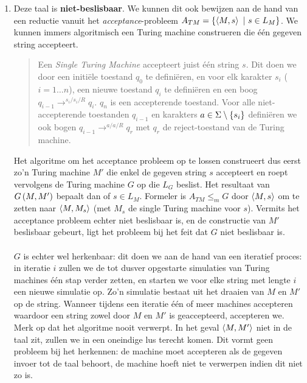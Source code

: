\documentclass{article}
\begin{document}
\begin{question}[Beslisbaarheid]
\begin{answer}
\begin{enumerate}
 \item Deze taal is \textbf{niet-beslisbaar}. We kunnen dit ook bewijzen aan de hand van een reductie vanuit het \emph{acceptance}-probleem $A_{TM}=\left\{ \left\langle M,s \right\rangle\ |\ s\in L_M \right\}$. We kunnen immers algoritmisch een Turing machine construeren die \'e\'en gegeven string accepteert.
 \begin{quote}
  \begin{construction}
   Een \emph{Single Turing Machine} accepteert juist \'e\'en string $s$. Dit doen we door een initi\"ele toestand $q_0$ te defini\"eren, en voor elk karakter $s_i$ ($i=1\ldots n$), een nieuwe toestand $q_i$ te defini\"eren en een boog $q_{i-1}\rightarrow^{s_i/s_i/R}q_{i}$. $q_n$ is een accepterende toestand. Voor alle niet-accepterende toestanden $q_{i-1}$ en karakters $a\in\Sigma\setminus\left\{ s_i \right\}$ defini\"eren we ook bogen $q_{i-1}\rightarrow^{a/a/R}q_r$ met $q_r$ de reject-toestand van de Turing machine.
  \end{construction}
 \end{quote}
Het algoritme om het acceptance probleem op te lossen construeert dus eerst zo'n Turing machine $M'$ die enkel de gegeven string $s$ accepteert en roept vervolgens de Turing machine $G$ op die $L_G$ beslist. Het resultaat van $G\left( M,M' \right)$ bepaalt dan of $s\in L_M$. Formeler is $A_{TM}\leq_mG$ door $\left\langle M,s \right\rangle$ om te zetten naar $\left\langle M,M_s \right\rangle$ (met $M_s$ de single Turing machine voor $s$). Vermits het acceptance probleem echter niet beslisbaar is, en de constructie van $M'$ beslisbaar gebeurt, ligt het probleem bij het feit dat $G$ niet beslisbaar is.

\paragraph{}
$G$ is echter wel herkenbaar: dit doen we aan de hand van een iteratief proces: in iteratie $i$ zullen we de tot dusver opgestarte simulaties van Turing machines \'e\'en stap verder zetten, en starten we voor elke string met lengte $i$ een nieuwe simulatie op. Zo'n simulatie bestaat uit het draaien van $M$ en $M'$ op de string. Wanneer tijdens een iteratie \'e\'en of meer machines accepteren waardoor een string zowel door $M$ en $M'$ is geaccepteerd, accepteren we. Merk op dat het algoritme nooit verwerpt. In het geval $\left\langle M,M' \right\rangle$ niet in de taal zit, zullen we in een oneindige lus terecht komen. Dit vormt geen probleem bij het herkennen: de machine moet accepteren als de gegeven invoer tot de taal behoort, de machine hoeft niet te verwerpen indien dit niet zo is.
\end{enumerate}
\end{answer}
\end{question}
\end{document}
